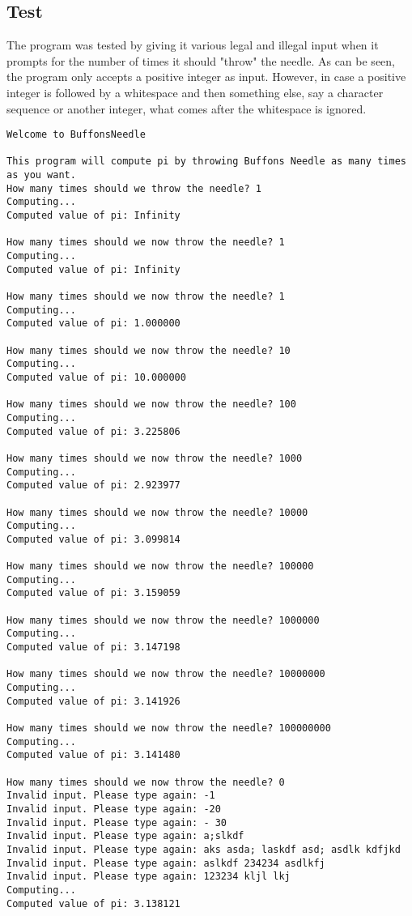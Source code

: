 \documentclass{scrartcl}
\begin{document}
\subsection*{Test}
The program was tested by giving it various legal and illegal input when 
it prompts for the number of times it should "throw" the needle. As can
be seen, the program only accepts a positive integer as input. However,
in case a positive integer is followed by a whitespace and then something
else, say a character sequence or another integer, what comes after the
whitespace is ignored.
\begin{Verbatim}
Welcome to BuffonsNeedle

This program will compute pi by throwing Buffons Needle as many times as you want.
How many times should we throw the needle? 1
Computing...
Computed value of pi: Infinity

How many times should we now throw the needle? 1
Computing...
Computed value of pi: Infinity

How many times should we now throw the needle? 1
Computing...
Computed value of pi: 1.000000

How many times should we now throw the needle? 10
Computing...
Computed value of pi: 10.000000

How many times should we now throw the needle? 100
Computing...
Computed value of pi: 3.225806

How many times should we now throw the needle? 1000
Computing...
Computed value of pi: 2.923977

How many times should we now throw the needle? 10000
Computing...
Computed value of pi: 3.099814

How many times should we now throw the needle? 100000
Computing...
Computed value of pi: 3.159059

How many times should we now throw the needle? 1000000
Computing...
Computed value of pi: 3.147198

How many times should we now throw the needle? 10000000
Computing...
Computed value of pi: 3.141926

How many times should we now throw the needle? 100000000
Computing...
Computed value of pi: 3.141480

How many times should we now throw the needle? 0
Invalid input. Please type again: -1
Invalid input. Please type again: -20
Invalid input. Please type again: - 30
Invalid input. Please type again: a;slkdf
Invalid input. Please type again: aks asda; laskdf asd; asdlk kdfjkd
Invalid input. Please type again: aslkdf 234234 asdlkfj
Invalid input. Please type again: 123234 kljl lkj
Computing...
Computed value of pi: 3.138121


\end{Verbatim}
\end{document}
